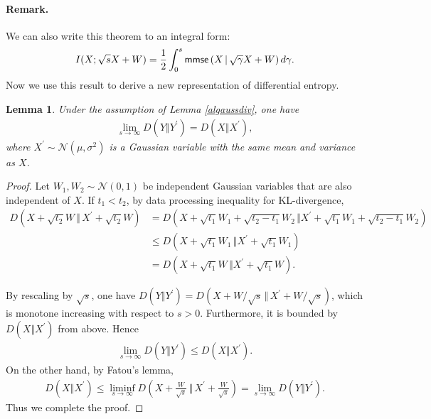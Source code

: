 \documentclass{article}
\numberwithin{equation}{section}
\renewcommand{\cal}{\mathcal}
\theoremstyle{plain}
\newtheorem{lemma}[theorem]{Lemma}
\theoremstyle{definition}
\begin{document}
\paragraph{Remark.} We can also write this theorem to an integral form:
\begin{align*}
	I(X;\sqrt{s}X+W)=\frac{1}{2}\int_0^s{\sf mmse}\left(X\,|\,\sqrt{\gamma}X+W\right)d\gamma.
\end{align*}
Now we use this result to derive a new representation of differential entropy.

\begin{lemma}\label{klmarkov}
Under the assumption of Lemma \ref{algaussdiv}, one have
\begin{align*}
	\lim_{s\to\infty}D(Y\Vert Y^\prime)=D(X\Vert X^\prime),
\end{align*}
where $X^\prime\sim\cal{N}(\mu,\sigma^2)$ is a Gaussian variable with the same mean and variance as $X$.
\end{lemma}
\begin{proof}
Let $W_1,W_2\sim\cal{N}(0,1)$ be independent Gaussian variables that are also independent of $X$. If $t_1<t_2$, by data processing inequality for KL-divergence,
\begin{align*}
	D(X+\sqrt{t_2}W\,\Vert\, X^\prime+\sqrt{t_2}W)&=D(X+\sqrt{t_1}W_1+\sqrt{t_2-t_1}W_2\,\Vert X^\prime+\sqrt{t_1}W_1+\sqrt{t_2-t_1}W_2)\\
	&\leq D(X+\sqrt{t_1}W_1\,\Vert X^\prime+\sqrt{t_1}W_1)\\
	&= D(X+\sqrt{t_1}W\,\Vert X^\prime+\sqrt{t_1}W).
\end{align*}

By rescaling by $\sqrt{s}$, one have $D(Y\Vert Y^\prime)=D(X+W/\sqrt{s}\,\Vert\, X^\prime+W/\sqrt{s})$, which is monotone increasing with respect to $s>0$. Furthermore, it is bounded by $D(X\Vert X^\prime)$ from above. Hence
\begin{align*}
	\lim_{s\to\infty}D(Y\Vert Y^\prime)\leq D(X\Vert X^\prime).
\end{align*} 
On the other hand, by Fatou's lemma,
\begin{align*}
	D(X\Vert X^\prime)\leq\liminf_{s\to\infty} D\left(X+\frac{W}{\sqrt{s}}\,\bigg\Vert\, X^\prime+\frac{W}{\sqrt{s}}\right)=\lim_{s\to\infty}D(Y\Vert Y^\prime).
\end{align*}
Thus we complete the proof.
\end{proof}
\end{document}
